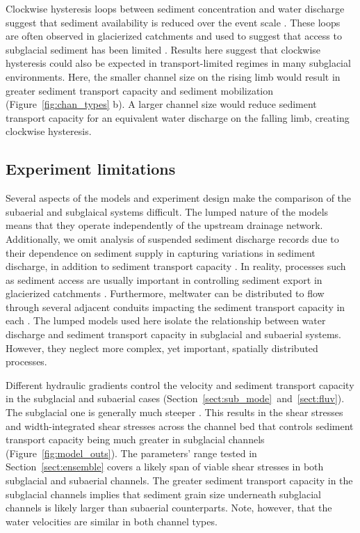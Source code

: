\documentclass[tc, manuscript]{copernicus}
\begin{document}
Clockwise hysteresis loops between sediment concentration and water discharge suggest that sediment availability is reduced over the event scale \citep[][]{williams1989}.
These loops are often observed in glacierized catchments and used to suggest that access to subglacial sediment has been limited \citep[e.g.][]{collins1979,willis1996,richards2003,stott2007,delaney2018}.
Results here suggest that clockwise hysteresis could also be expected in transport-limited regimes in many subglacial environments.
Here, the smaller channel size on the rising limb would result in greater sediment transport capacity and sediment mobilization (Figure~\ref{fig:chan_types} b).
A larger channel size would reduce sediment transport capacity for an equivalent water discharge on the falling limb, creating clockwise hysteresis. 

\subsection{Experiment limitations}

Several aspects of the models and experiment design make the comparison of the subaerial and subglaical systems difficult. 
The lumped nature of the models means that they operate independently of the upstream drainage network.
Additionally, we omit analysis of suspended sediment discharge records due to their dependence on sediment supply in capturing variations in sediment discharge, in addition to sediment transport capacity \citep[e.g.][]{delaney2019}.
In reality, processes such as sediment access are usually important in controlling sediment export in glacierized catchments \citep[e.g.][]{herman2015,vergara2022}.
Furthermore, meltwater can be distributed to flow through several adjacent conduits impacting the sediment transport capacity in each \citep[e.g.][]{werder2013,hewitt2019,delaney2023}.
The lumped models used here isolate the relationship between water discharge and sediment transport capacity in subglacial and subaerial systems. 
However, they neglect more complex, yet important, spatially distributed processes.

Different hydraulic gradients control the velocity and sediment transport capacity in the subglacial and subaerial cases (Section~\ref{sect:sub_mode}~and~\ref{sect:fluv}). 
The subglacial one is generally much steeper \citep{alley1997}.
This results in the shear stresses and width-integrated shear stresses across the channel bed that controls sediment transport capacity being much greater in subglacial channels (Figure~\ref{fig:model_outs}).
The parameters' range tested in Section~\ref{sect:ensemble} covers a likely span of viable shear stresses in both subglacial and subaerial channels.
The greater sediment transport capacity in the subglacial channels implies that sediment grain size underneath subglacial channels is likely larger than subaerial counterparts.
Note, however, that the water velocities are similar in both channel types.
\end{document}
